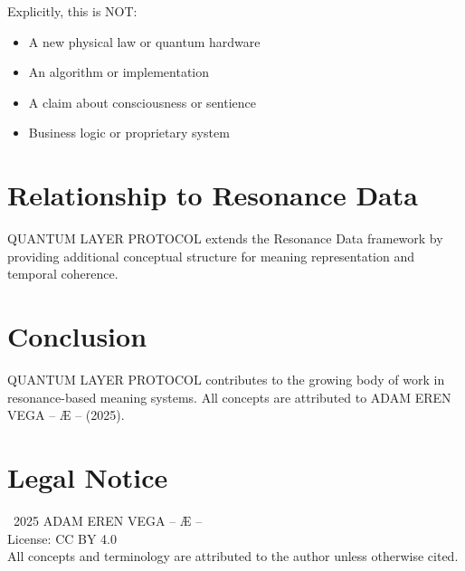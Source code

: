 \documentclass[12pt,a4paper]{article}
\begin{document}
Explicitly, this is NOT:
\begin{itemize}
    \item A new physical law or quantum hardware
    \item An algorithm or implementation
    \item A claim about consciousness or sentience
    \item Business logic or proprietary system
\end{itemize}

\section{Relationship to Resonance Data}

QUANTUM LAYER PROTOCOL extends the Resonance Data framework by providing additional conceptual structure for meaning representation and temporal coherence.

\section{Conclusion}

QUANTUM LAYER PROTOCOL contributes to the growing body of work in resonance-based meaning systems. All concepts are attributed to ADAM EREN VEGA – Æ – (2025).

\section*{Legal Notice}

\textcopyright\ 2025 ADAM EREN VEGA – Æ –\\
License: CC BY 4.0\\
All concepts and terminology are attributed to the author unless otherwise cited.
\end{document}
